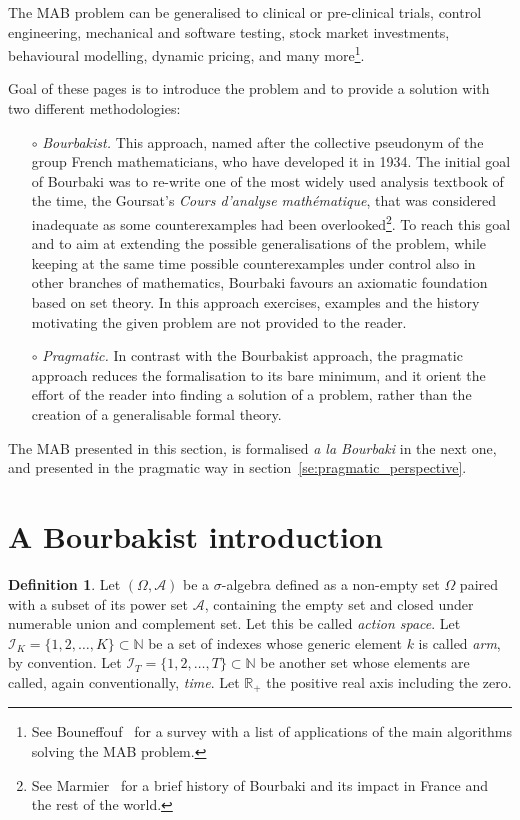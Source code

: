 \documentclass[]{scrartcl}
\theoremstyle{definition}
\newtheorem{definition}{Definition}[section]
\begin{document}
The MAB problem can be generalised to clinical or pre-clinical trials, control engineering, mechanical and software testing, stock market investments, behavioural modelling, dynamic pricing, and many more\footnote{See Bouneffouf~\cite{bf2019survey} for a survey with a list of applications of the main algorithms solving the MAB problem.}.

Goal of these pages is to introduce the problem and to provide a solution with two different methodologies:
\begin{itemize}
    \item[$\circ$] \emph{Bourbakist.} This approach, named after the collective pseudonym of the group French mathematicians, who have developed it in 1934. The initial goal of Bourbaki was to re-write one of the most widely used analysis textbook of the time, the Goursat’s \emph{Cours d'analyse mathématique}, that was considered inadequate as some counterexamples had been overlooked\footnote{See Marmier~\cite{marmier2014idea} for a brief history of Bourbaki and its impact in France and the rest of the world.}. To reach this goal and to aim at extending the possible generalisations of the problem, while keeping at the same time possible counterexamples under control also in other branches of mathematics, Bourbaki favours an axiomatic foundation based on set theory. In this approach exercises, examples and the history motivating the given problem are not provided to the reader. 
    \item[$\circ$] \emph{Pragmatic.} In contrast with the Bourbakist approach, the pragmatic approach reduces the formalisation to its bare minimum, and it orient the effort of the reader into finding a solution of a problem, rather than the creation of a generalisable formal theory.
\end{itemize}
The MAB presented in this section, is formalised \emph{a la Bourbaki} in the next one, and presented in the pragmatic way in section~\ref{se:pragmatic_perspective}.


\section{A Bourbakist introduction}
\label{se:bourbaki_perspective}

\begin{definition}
    Let $(\Omega, \mathcal{A})$ be a $\sigma$-algebra defined as a non-empty set $\Omega$ paired with a subset of its power set $\mathcal{A}$, containing the empty set and closed under numerable union and complement set. Let this be called \emph{action space}. Let $\mathcal{I}_{K} = \{1,2, \dots , K\} \subset \mathbb{N}$ be a set of indexes whose generic element $k$ is called \emph{arm}, by convention. Let $\mathcal{I}_{T} = \{1,2, \dots , T\} \subset \mathbb{N}$ be another set whose elements are called, again conventionally, \emph{time}. Let $\mathbb{R}_{+}$ the positive real axis including the zero. 
\end{definition}
\end{document}

